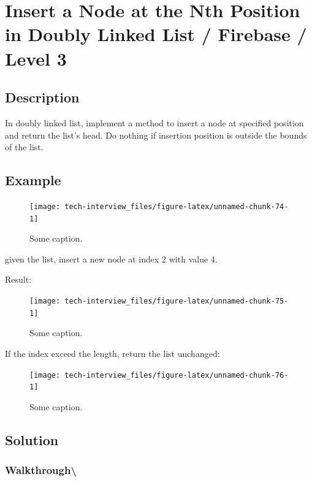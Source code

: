 \documentclass[]{book}
\begin{document}
\hypertarget{insert-a-node-at-the-nth-position-in-doubly-linked-list-firebase-level-3}{%
\section{Insert a Node at the Nth Position in Doubly Linked List / Firebase / Level 3}\label{insert-a-node-at-the-nth-position-in-doubly-linked-list-firebase-level-3}}

\hypertarget{description-98}{%
\subsection{Description}\label{description-98}}

In doubly linked list, implement a method to insert a node at specified position and return the list's head. Do nothing
if insertion position is outside the bounds of the list.

\hypertarget{example-94}{%
\subsection{Example}\label{example-94}}

\begin{figure}
\texttt{[image: tech-interview\_files/figure-latex/unnamed-chunk-74-1]} \caption{Some caption.}\label{fig:unnamed-chunk-74}
\end{figure}

given the list, insert a new node at index 2 with value 4.

Result:

\begin{figure}
\texttt{[image: tech-interview\_files/figure-latex/unnamed-chunk-75-1]} \caption{Some caption.}\label{fig:unnamed-chunk-75}
\end{figure}

If the index exceed the length, return the list unchanged:

\begin{figure}
\texttt{[image: tech-interview\_files/figure-latex/unnamed-chunk-76-1]} \caption{Some caption.}\label{fig:unnamed-chunk-76}
\end{figure}

\hypertarget{solution-68}{%
\subsection{Solution}\label{solution-68}}

\hypertarget{walkthrough-115}{%
\subsubsection{Walkthrough\textbackslash{}}\label{walkthrough-115}}
\end{document}
